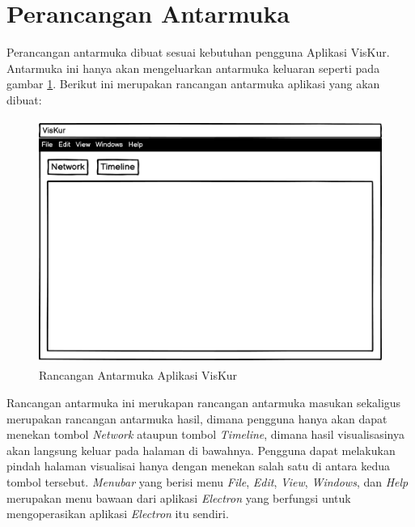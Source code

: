 \section{Perancangan Antarmuka}
Perancangan antarmuka dibuat sesuai kebutuhan pengguna Aplikasi VisKur. Antarmuka ini hanya akan mengeluarkan antarmuka keluaran seperti pada gambar \ref{fig:balsamiq}. Berikut ini merupakan rancangan antarmuka aplikasi yang akan dibuat:

\begin{figure}[H]
    \centering
    \includegraphics[width=12cm, height=8cm]{Gambar/Balsamiq.png}
    \caption{Rancangan Antarmuka Aplikasi VisKur}
    \label{fig:balsamiq}
\end{figure}
Rancangan antarmuka ini merukapan rancangan antarmuka masukan sekaligus merupakan rancangan antarmuka hasil, dimana pengguna hanya akan dapat menekan tombol \textit{Network} ataupun tombol \textit{Timeline}, dimana hasil visualisasinya akan langsung keluar pada halaman di bawahnya. Pengguna dapat melakukan pindah halaman visualisai hanya dengan menekan salah satu di antara kedua tombol tersebut. \textit{Menubar} yang berisi menu \textit{File}, \textit{Edit}, \textit{View}, \textit{Windows}, dan \textit{Help} merupakan menu bawaan dari aplikasi \textit{Electron} yang berfungsi untuk mengoperasikan aplikasi \textit{Electron} itu sendiri. 




